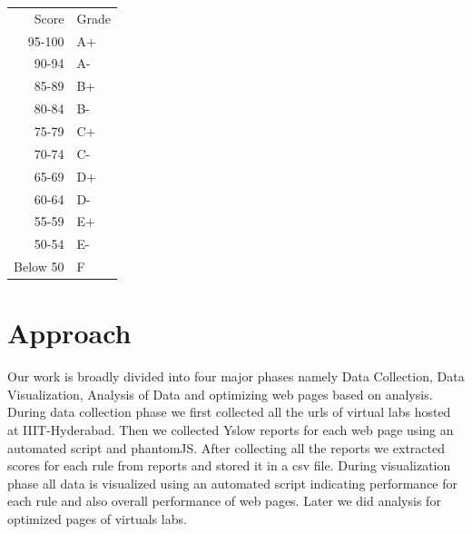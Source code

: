 \documentclass[a4paper,10pt]{IEEEtran}
\begin{document}
% 
% 
% 
% 
% 
\begin{center}
\begin{tabular}{rl}
    Score  &  Grade  \\
   95-100  &  A+     \\
    90-94  &  A-     \\
    85-89  &  B+     \\
    80-84  &  B-     \\
    75-79  &  C+     \\
    70-74  &  C-     \\
    65-69  &  D+     \\
    60-64  &  D-     \\
    55-59  &  E+     \\
    50-54  &  E-     \\
 Below 50  &  F      \\
\end{tabular}
\end{center}

\section{Approach}\label{sec-4}
Our work is broadly divided into four major phases namely Data Collection, Data
Visualization, Analysis of Data and optimizing web pages based on analysis.
During data collection phase we first collected all the urls of virtual labs
hosted at IIIT-Hyderabad. Then we collected Yslow reports for each web page
using an automated script and phantomJS. After collecting all the reports we
extracted scores for each rule from reports and stored it in a csv file. During
visualization phase all data is visualized using an automated script indicating
performance for each rule and also overall performance of web pages. Later we
did analysis for optimized pages of virtuals labs.
\end{document}
